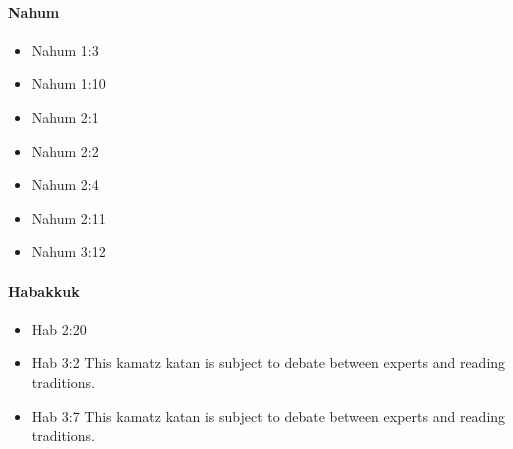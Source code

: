 \documentclass[14pt]{article}
\begin{document}
															\paragraph{Nahum}
														\begin{multicols}{2}\begin{itemize}
																
																\item Nahum 1:3
											
																		
																		\item Nahum 1:10
																		
																		\item Nahum 2:1
																				
																				\item Nahum 2:2
																				
																				\item Nahum 2:4
																				
																				\item Nahum 2:11
																				
																				\item Nahum 3:12
																				
																												\end{itemize}\end{multicols}
																			\paragraph{Habakkuk}
																		\begin{multicols}{2}\begin{itemize}
																				
																				\item Hab 2:20\hebword{קׇדְשׁ֑וֹ}
																				
																				\item Hab 3:2 This kamatz katan is subject to debate between experts and reading traditions.
																				
																				\item Hab 3:7 This kamatz katan is subject to debate between experts and reading traditions.
																				
																												\end{itemize}\end{multicols}
\end{document}
